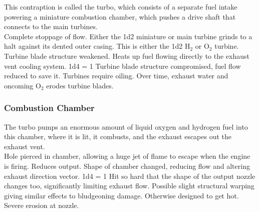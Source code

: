 \documentclass[a4paper]{article}
\begin{document}
This contraption is called the turbo, which consists of a separate fuel intake powering a miniature combustion chamber, which pushes a drive shaft that connects to the main turbines.
\\ \pbhw
{}
{Complete stoppage of flow. Either the 1d2 miniature or main turbine grinds to a halt against its dented outer casing. This is either the 1d2 H$_2$ or O$_2$ turbine.}
{Turbine blade structure weakened. Heats up fuel flowing directly to the exhaust vent cooling system. \newline 1d4 = 1 Turbine blade structure compromised, fuel flow reduced to save it.}
{Turbines require oiling. Over time, exhaust water and oncoming O$_2$ erodes turbine blades. }

\vspace{-0.5cm} \hspace{-18pt} \subsubsection{Combustion Chamber} \label{engine_combustion} \vspace{-0.2cm}
The turbo pumps an enormous amount of liquid oxygen and hydrogen fuel into this chamber, where it is lit, it combusts, and the exhaust escapes out the exhaust vent. 
\\ \pbhw
{Hole pierced in chamber, allowing a huge jet of flame to escape when the engine is firing. Reduces output.}
{Shape of chamber changed, reducing flow and altering exhaust direction vector. \newline 1d4 = 1 Hit so hard that the shape of the output nozzle changes too, significantly limiting exhaust flow. }
{Possible slight structural warping giving similar effects to bludgeoning damage. Otherwise designed to get hot.}
{Severe erosion at nozzle.}
\end{document}
